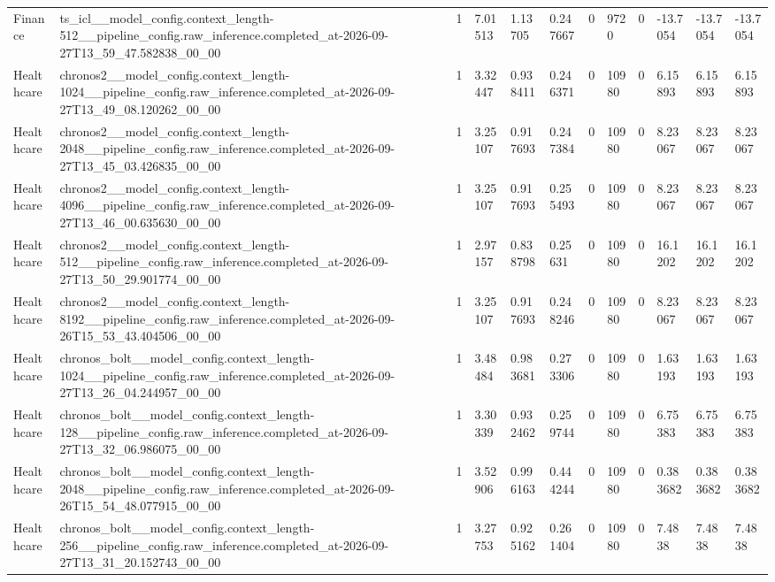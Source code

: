 \begin{tabular}{llllllllllll}
Finance & ts\_icl\_\_model\_config.context\_length-512\_\_pipeline\_config.raw\_inference.completed\_at-2026-09-27T13\_59\_47.582838\_00\_00 & 1 & 7.01513 & 1.13705 & 0.247667 & 0 & 9720 & 0 & -13.7054 & -13.7054 & -13.7054 \\
Healthcare & chronos2\_\_model\_config.context\_length-1024\_\_pipeline\_config.raw\_inference.completed\_at-2026-09-27T13\_49\_08.120262\_00\_00 & 1 & 3.32447 & 0.938411 & 0.246371 & 0 & 10980 & 0 & 6.15893 & 6.15893 & 6.15893 \\
Healthcare & chronos2\_\_model\_config.context\_length-2048\_\_pipeline\_config.raw\_inference.completed\_at-2026-09-27T13\_45\_03.426835\_00\_00 & 1 & 3.25107 & 0.917693 & 0.247384 & 0 & 10980 & 0 & 8.23067 & 8.23067 & 8.23067 \\
Healthcare & chronos2\_\_model\_config.context\_length-4096\_\_pipeline\_config.raw\_inference.completed\_at-2026-09-27T13\_46\_00.635630\_00\_00 & 1 & 3.25107 & 0.917693 & 0.255493 & 0 & 10980 & 0 & 8.23067 & 8.23067 & 8.23067 \\
Healthcare & chronos2\_\_model\_config.context\_length-512\_\_pipeline\_config.raw\_inference.completed\_at-2026-09-27T13\_50\_29.901774\_00\_00 & 1 & 2.97157 & 0.838798 & 0.25631 & 0 & 10980 & 0 & 16.1202 & 16.1202 & 16.1202 \\
Healthcare & chronos2\_\_model\_config.context\_length-8192\_\_pipeline\_config.raw\_inference.completed\_at-2026-09-26T15\_53\_43.404506\_00\_00 & 1 & 3.25107 & 0.917693 & 0.248246 & 0 & 10980 & 0 & 8.23067 & 8.23067 & 8.23067 \\
Healthcare & chronos\_bolt\_\_model\_config.context\_length-1024\_\_pipeline\_config.raw\_inference.completed\_at-2026-09-27T13\_26\_04.244957\_00\_00 & 1 & 3.48484 & 0.983681 & 0.273306 & 0 & 10980 & 0 & 1.63193 & 1.63193 & 1.63193 \\
Healthcare & chronos\_bolt\_\_model\_config.context\_length-128\_\_pipeline\_config.raw\_inference.completed\_at-2026-09-27T13\_32\_06.986075\_00\_00 & 1 & 3.30339 & 0.932462 & 0.259744 & 0 & 10980 & 0 & 6.75383 & 6.75383 & 6.75383 \\
Healthcare & chronos\_bolt\_\_model\_config.context\_length-2048\_\_pipeline\_config.raw\_inference.completed\_at-2026-09-26T15\_54\_48.077915\_00\_00 & 1 & 3.52906 & 0.996163 & 0.444244 & 0 & 10980 & 0 & 0.383682 & 0.383682 & 0.383682 \\
Healthcare & chronos\_bolt\_\_model\_config.context\_length-256\_\_pipeline\_config.raw\_inference.completed\_at-2026-09-27T13\_31\_20.152743\_00\_00 & 1 & 3.27753 & 0.925162 & 0.261404 & 0 & 10980 & 0 & 7.4838 & 7.4838 & 7.4838 \\

\end{tabular}
